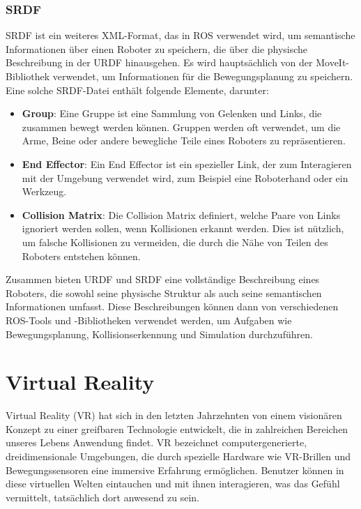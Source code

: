 \subsubsection{SRDF}\label{subsubsec:SRDF}
\ac{SRDF} ist ein weiteres \ac{XML}-Format, das in \ac{ROS} verwendet wird, um semantische Informationen über einen Roboter zu speichern, die über die physische Beschreibung in der URDF hinausgehen. Es wird hauptsächlich von der MoveIt-Bibliothek verwendet, um Informationen für die Bewegungsplanung zu speichern. Eine solche \ac{SRDF}-Datei enthält folgende Elemente, darunter:
\begin{itemize}
    \item \textbf{Group}: Eine Gruppe ist eine Sammlung von Gelenken und Links, die zusammen bewegt werden können. Gruppen werden oft verwendet, um die Arme, Beine oder andere bewegliche Teile eines Roboters zu repräsentieren.
    \item \textbf{End Effector}: Ein End Effector ist ein spezieller Link, der zum Interagieren mit der Umgebung verwendet wird, zum Beispiel eine Roboterhand oder ein Werkzeug.
    \item \textbf{Collision Matrix}: Die Collision Matrix definiert, welche Paare von Links ignoriert werden sollen, wenn Kollisionen erkannt werden. Dies ist nützlich, um falsche Kollisionen zu vermeiden, die durch die Nähe von Teilen des Roboters entstehen können.
\end{itemize}
Zusammen bieten \ac{URDF} und \ac{SRDF} eine vollständige Beschreibung eines Roboters, die sowohl seine physische Struktur als auch seine semantischen Informationen umfasst. Diese Beschreibungen können dann von verschiedenen \ac{ROS}-Tools und -Bibliotheken verwendet werden, um Aufgaben wie Bewegungsplanung, Kollisionserkennung und Simulation durchzuführen.




\section{Virtual Reality}
Virtual Reality (VR) hat sich in den letzten Jahrzehnten von einem visionären Konzept zu einer greifbaren Technologie entwickelt, die in zahlreichen Bereichen unseres Lebens Anwendung findet. VR bezeichnet computergenerierte, dreidimensionale Umgebungen, die durch spezielle Hardware wie VR-Brillen und Bewegungssensoren eine immersive Erfahrung ermöglichen. Benutzer können in diese virtuellen Welten eintauchen und mit ihnen interagieren, was das Gefühl vermittelt, tatsächlich dort anwesend zu sein.
\\

